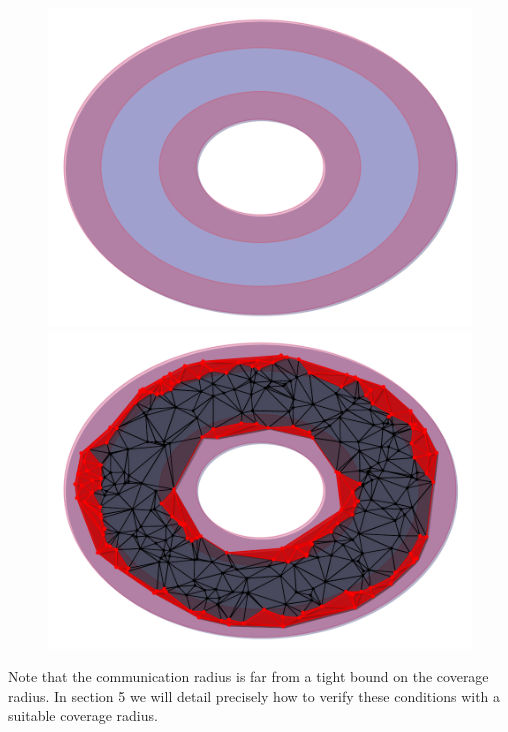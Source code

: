 \begin{figure}[htbp]
\centering
    \includegraphics[scale=0.5]{figures/boundary_domain.pdf}
    \includegraphics[scale=0.5]{figures/boundary_complex_domain_fence.pdf}
     \caption{}
     \label{fig:boundary2}
 \end{figure}

Note that the communication radius is far from a tight bound on the coverage radius.
In section 5 we will detail precisely how to verify these conditions with a suitable coverage radius.

